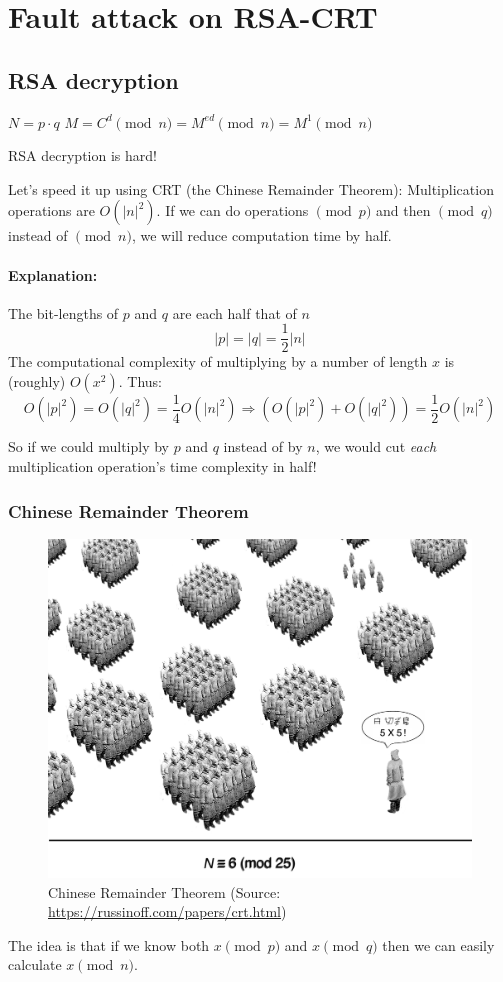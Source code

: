 \section{Fault attack on RSA-CRT}\label{sec:fault_attack_on_rsa_crt}

\subsection{RSA decryption}\label{subsec:rsa_decryption}
\(N = p\cdot q\)
\(M = C^d \pmod{n} = M^{ed} \pmod{n} = M^1 \pmod{n}\)

RSA decryption is hard!

Let's speed it up using CRT (the Chinese Remainder Theorem):
Multiplication operations are \(O(|n|^2)\). If we can do operations \(\pmod{p}\)
and then \(\pmod{q}\) instead of \(\pmod{n}\), we will reduce computation time by half.

\paragraph{Explanation:}

The bit-lengths of \(p\) and \(q\) are each half that of \(n\)
\[|p|=|q|=\frac{1}{2}|n|\]
The computational complexity of multiplying by a number of length \(x\) is (roughly) \(O(x^2)\). Thus:
\[
O(|p|^2) = O(|q|^2) = \frac{1}{4}O(|n|^2) \Rightarrow (O(|p|^2) + O(|q|^2)) = \frac{1}{2}O(|n|^2)
\]

So if we could multiply by \(p\) and \(q\) instead of by \(n\), we would cut \emph{each} multiplication operation's time complexity in half!

\subsubsection{Chinese Remainder Theorem}\label{subsubsec:chinese_remainder_theorem}
\begin{figure}[!ht]
	\centering
	\includegraphics[width=0.5\linewidth]{images/chapter_9/soldiers.jpeg}
	\caption{Chinese Remainder Theorem (Source: \url{https://russinoff.com/papers/crt.html})}\label{fig:chinese_remainder}
\end{figure}
The idea is that if we know both \(x \pmod{p}\) and \(x \pmod{q}\) then we can 
easily calculate \(x \pmod{n}\).

